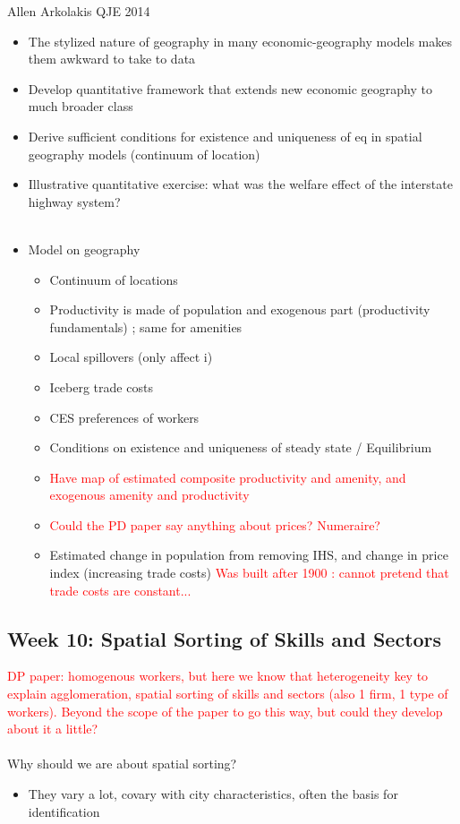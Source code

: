 \documentclass[12pt, final]{article}
\begin{document}
Allen Arkolakis QJE 2014
\begin{itemize}
    \item The stylized nature of geography in many economic-geography models makes them awkward to take to data
    \item Develop quantitative framework that extends new economic geography to much broader class
    \item Derive sufficient conditions for existence and uniqueness of eq in spatial geography models (continuum of location)
    \item Illustrative quantitative exercise: what was the welfare effect of the interstate highway system?
    \\
    \\
    \item Model on geography
    \begin{itemize}
        \item Continuum of locations
        \item Productivity is made of population and exogenous part (productivity fundamentals) ; same for amenities
        \item Local spillovers (only affect i)
        \item Iceberg trade costs
        \item CES preferences of workers
        \item Conditions on existence and uniqueness of steady state / Equilibrium
        \item \textcolor{red}{Have map of estimated composite productivity and amenity, and exogenous amenity and productivity}
        \item \textcolor{red}{Could the PD paper say anything about prices? Numeraire?}
        \item Estimated change in population from removing IHS, and change in price index (increasing trade costs) \textcolor{red}{Was built after 1900 : cannot pretend that trade costs are constant...}
    \end{itemize}
\end{itemize}


\subsection{Week 10: Spatial Sorting of Skills and Sectors} %
\label{sub:week_10_spatial_sorting_of_skills_and_sectors}

\textcolor{red}{DP paper: homogenous workers, but here we know that heterogeneity key to explain agglomeration, spatial sorting of skills and sectors (also 1 firm, 1 type of workers). Beyond the scope of the paper to go this way, but could they develop about it a little? }
\\
\\
Why should we are about spatial sorting?
\begin{itemize}
    \item They vary a lot, covary with city characteristics, often the basis for identification
\end{itemize}
\end{document}
